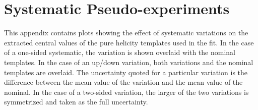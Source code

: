 \clearpage
\section{Systematic Pseudo-experiments}
\label{app:systPEs}
This appendix contains plots showing the effect of systematic variations on the extracted central values of the pure helicity templates used in the fit. In the case of a one-sided systematic, the variation is shown overlaid with the nominal templates. In the case of an up/down variation, both variations and the nominal templates are overlaid. The uncertainty quoted for a particular variation is the difference between the mean value of the variation and the mean value of the nominal. In the case of a two-sided variation, the larger of the two variations is symmetrized and taken as the full uncertainty.


